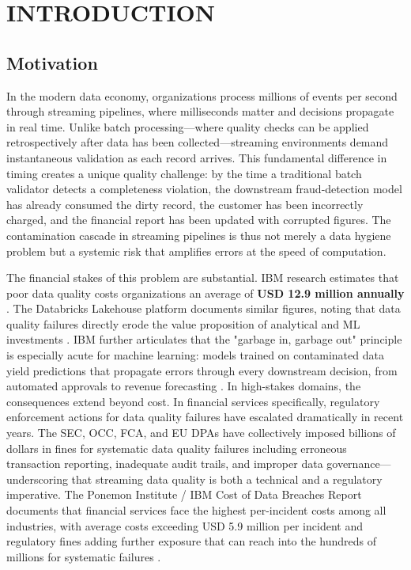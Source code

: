 \chapter{INTRODUCTION}
\pagestyle{fancy}

\section{Motivation}
In the modern data economy, organizations process millions of events per second through streaming pipelines, where milliseconds matter and decisions propagate in real time. Unlike batch processing---where quality checks can be applied retrospectively after data has been collected---streaming environments demand instantaneous validation as each record arrives. This fundamental difference in timing creates a unique quality challenge: by the time a traditional batch validator detects a completeness violation, the downstream fraud-detection model has already consumed the dirty record, the customer has been incorrectly charged, and the financial report has been updated with corrupted figures. The contamination cascade in streaming pipelines is thus not merely a data hygiene problem but a systemic risk that amplifies errors at the speed of computation.

The financial stakes of this problem are substantial. IBM research estimates that poor data quality costs organizations an average of \textbf{USD 12.9 million annually} \cite{ibm_data_quality_cost}. The Databricks Lakehouse platform documents similar figures, noting that data quality failures directly erode the value proposition of analytical and ML investments \cite{Armbrust2021Lakehouse}. IBM further articulates that the "garbage in, garbage out" principle is especially acute for machine learning: models trained on contaminated data yield predictions that propagate errors through every downstream decision, from automated approvals to revenue forecasting \cite{ibm_dq2024}. In high-stakes domains, the consequences extend beyond cost. In financial services specifically, regulatory enforcement actions for data quality failures have escalated dramatically in recent years. The SEC, OCC, FCA, and EU DPAs have collectively imposed billions of dollars in fines for systematic data quality failures including erroneous transaction reporting, inadequate audit trails, and improper data governance---underscoring that streaming data quality is both a technical and a regulatory imperative. The Ponemon Institute / IBM Cost of Data Breaches Report documents that financial services face the highest per-incident costs among all industries, with average costs exceeding USD 5.9 million per incident and regulatory fines adding further exposure that can reach into the hundreds of millions for systematic failures \cite{ibm_dq2024, ponemon2024}.

